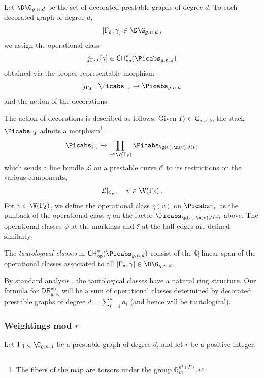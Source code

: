 Let $\D\G_{g,n,d}$ be the set of decorated prestable graphs of degree $d$.
To each decorated graph of degree $d$,
$$[\Gamma_\delta,\gamma]\in \D\G_{g,n,d}\,,$$ we assign the
operational class
$$j_{\Gamma_\delta*}[\gamma] \in \mathsf{CH}^*_{\mathsf{op}}(\Picabs_{g,n,d})$$
obtained
via the proper representable morphism
$$j_{\Gamma_\delta} : \Picabs_{\Gamma_\delta} \rightarrow \Picabs_{g,n,d}$$
and the action of the decorations.

The action of decorations is described
as follows.
Given $\Gamma_\delta\in \mathsf{G}_{g,n,k}$, the stack $\Picabs_{\Gamma_\delta}$ admits a morphism{\footnote{The fibers of the map are torsors under the group $\mathbb{G}_m^{h^1(\Gamma)}$.}}
\[\Picabs_{\Gamma_\delta} \to \prod_{v \in \V(\Gamma_\delta)} \Picabs_{\g(v),\n(v),\delta(v)}\]
which sends a line bundle $\mathcal{L}$ on a prestable curve $\mathcal{C}$ to its restrictions on the various components,
$$ \mathcal{L}|_{\mathcal{C}_v}\, , \  \ \  v\in \V(\Gamma_\delta)\, . $$
For $v \in \V(\Gamma_\delta)$, we define the operational
class $\eta(v)$ on $\Picabs_{\Gamma_\delta}$ as the pullback of the operational class $\eta$ on the factor $\Picabs_{\g(v),\n(v),\delta(v)}$ above. The operational
classes $\psi$ at the markings and $\xi$ at the half-edges are
defined similarly.




\begin{definition}
\notready The {\em tautological  classes} in
 $\mathsf{CH}^*_{\mathsf{op}}(\Picabs_{g,n,d})$ consist of the
 $\mathbb{Q}$-linear span
 of the operational classes associated to
 all $[\Gamma_\delta,\gamma]\in \D\G_{g,n,d}$.
\end{definition}

By standard analysis \cite{GraberPandharipande}, the tautological classes
have a natural ring structure.
Our formula for $\mathsf{DR}_{g,A}^{\mathsf{op}}$
will be a sum of operational classes
determined by decorated prestable graphs of degree $d=\sum_{i=1}^n a_i$
(and hence will be tautological).

\subsubsection{Weightings mod \texorpdfstring{$r$}{r}} \label{Ssec:weightings}
Let $\Gamma_\delta\in \G_{g,n,d}$ be a prestable graph of degree $d$, and
let $r$ be a positive integer.


